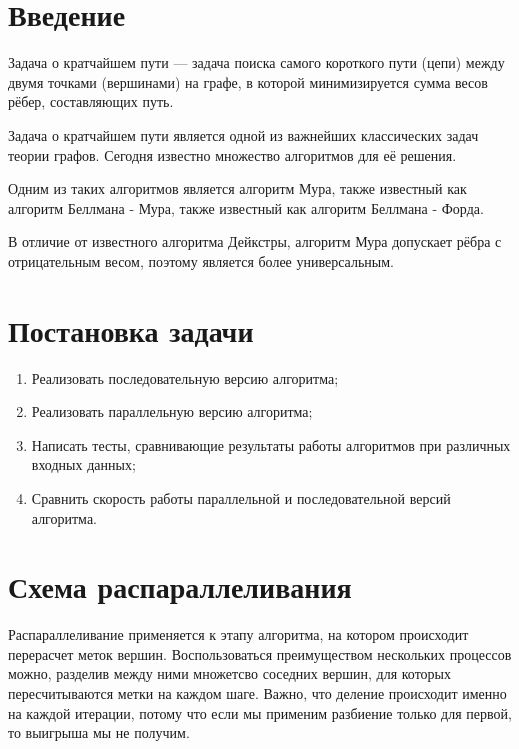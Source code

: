 \documentclass{report}
\begin{document}
\newpage

\section*{Введение}

Задача о кратчайшем пути — задача поиска самого короткого пути (цепи) между двумя точками (вершинами)
 на графе, в которой минимизируется сумма весов рёбер, составляющих путь.
\par

Задача о кратчайшем пути является одной из важнейших классических задач теории графов. Сегодня известно множество алгоритмов для её решения.
\par

Одним из таких алгоритмов является алгоритм Мура, также известный как алгоритм Беллмана - Мура, также известный как алгоритм Беллмана - Форда.
\par

В отличие от известного алгоритма Дейкстры, алгоритм Мура допускает рёбра с отрицательным весом, поэтому является более универсальным.

\newpage

\section{Постановка задачи}

\begin{enumerate}
 \item Реализовать последовательную версию алгоритма;
 \item Реализовать параллельную версию алгоритма;
 \item Написать тесты, сравнивающие результаты работы алгоритмов при различных входных данных;
 \item Сравнить скорость работы параллельной и последовательной версий алгоритма.
\end{enumerate}

\newpage

\section{Схема распараллеливания}

Распараллеливание применяется к этапу алгоритма, на котором происходит перерасчет меток вершин.
Воспользоваться преимуществом нескольких процессов можно, разделив между ними множетсво соседних вершин,
для которых пересчитываются метки на каждом шаге. Важно, что деление происходит именно на каждой итерации,
потому что если мы применим разбиение только для первой, то выигрыша мы не получим.
\end{document}
